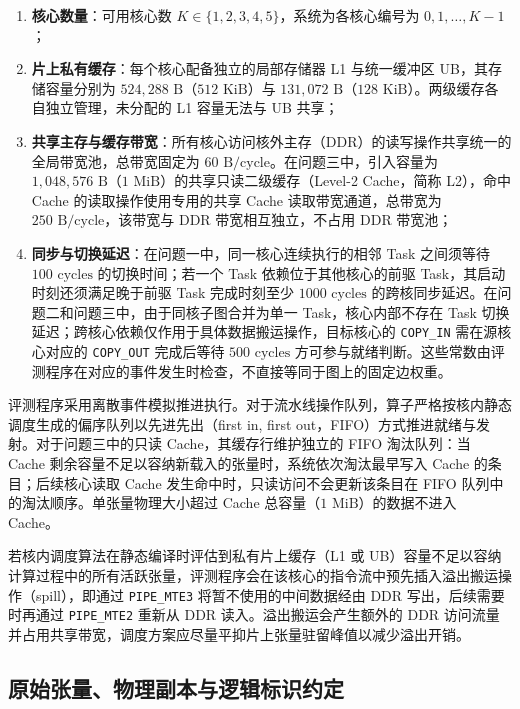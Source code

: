 \documentclass[anonymous,withtoc]{gmcm2026}
\providecommand{\tightlist}{\setlength{\itemsep}{0pt}\setlength{\parskip}{0pt}}
\begin{document}
\begin{enumerate}
\def\labelenumi{\arabic{enumi}.}
\tightlist
\item
  \textbf{核心数量}：可用核心数 \(K \in \{1, 2, 3, 4, 5\}\)，系统为各核心编号为 \(0, 1, \dots, K-1\)；
\item
  \textbf{片上私有缓存}：每个核心配备独立的局部存储器 L1 与统一缓冲区 UB，其存储容量分别为 \(524{,}288\text{ B}\)（\(512\text{ KiB}\)）与 \(131{,}072\text{ B}\)（\(128\text{ KiB}\)）。两级缓存各自独立管理，未分配的 L1 容量无法与 UB 共享；
\item
  \textbf{共享主存与缓存带宽}：所有核心访问核外主存（DDR）的读写操作共享统一的全局带宽池，总带宽固定为 \(60\text{ B/cycle}\)。在问题三中，引入容量为 \(1{,}048{,}576\text{ B}\)（\(1\text{ MiB}\)）的共享只读二级缓存（Level-2 Cache，简称 L2），命中 Cache 的读取操作使用专用的共享 Cache 读取带宽通道，总带宽为 \(250\text{ B/cycle}\)，该带宽与 DDR 带宽相互独立，不占用 DDR 带宽池；
\item
  \textbf{同步与切换延迟}：在问题一中，同一核心连续执行的相邻 Task 之间须等待 \(100\text{ cycles}\) 的切换时间；若一个 Task 依赖位于其他核心的前驱 Task，其启动时刻还须满足晚于前驱 Task 完成时刻至少 \(1000\text{ cycles}\) 的跨核同步延迟。在问题二和问题三中，由于同核子图合并为单一 Task，核心内部不存在 Task 切换延迟；跨核心依赖仅作用于具体数据搬运操作，目标核心的 \texttt{COPY\_IN} 需在源核心对应的 \texttt{COPY\_OUT} 完成后等待 \(500\text{ cycles}\) 方可参与就绪判断。这些常数由评测程序在对应的事件发生时检查，不直接等同于图上的固定边权重。
\end{enumerate}

评测程序采用离散事件模拟推进执行。对于流水线操作队列，算子严格按核内静态调度生成的偏序队列以先进先出（first in, first out，FIFO）方式推进就绪与发射。对于问题三中的只读 Cache，其缓存行维护独立的 FIFO 淘汰队列：当 Cache 剩余容量不足以容纳新载入的张量时，系统依次淘汰最早写入 Cache 的条目；后续核心读取 Cache 发生命中时，只读访问不会更新该条目在 FIFO 队列中的淘汰顺序。单张量物理大小超过 Cache 总容量（\(1\text{ MiB}\)）的数据不进入 Cache。

若核内调度算法在静态编译时评估到私有片上缓存（L1 或 UB）容量不足以容纳计算过程中的所有活跃张量，评测程序会在该核心的指令流中预先插入溢出搬运操作（spill），即通过 \texttt{PIPE\_MTE3} 将暂不使用的中间数据经由 DDR 写出，后续需要时再通过 \texttt{PIPE\_MTE2} 重新从 DDR 读入。溢出搬运会产生额外的 DDR 访问流量并占用共享带宽，调度方案应尽量平抑片上张量驻留峰值以减少溢出开销。

\subsection{原始张量、物理副本与逻辑标识约定}
\end{document}
